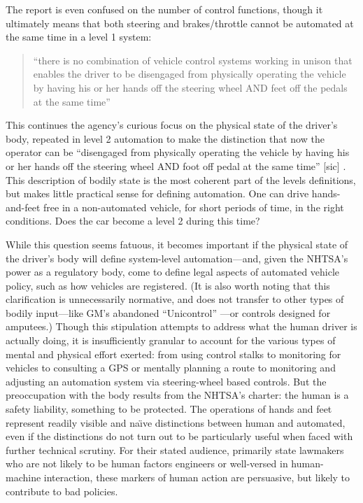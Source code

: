 The report is even confused on the number of control functions, though
it ultimately means that both steering and brakes/throttle cannot be
automated at the same time in a level 1 system: 

\begin{quote}
``there is no combination of vehicle control systems working in unison
that enables the driver to be disengaged from physically operating the
vehicle by having his or her hands off the steering wheel AND feet off
the pedals at the same time'' \cite[p. 4]{NHTSA}
\end{quote}

This continues the agency's curious focus on the physical state of the
driver's body, repeated in level 2 automation to make the distinction
that now the operator can be ``disengaged from physically operating the
vehicle by having his or her hands off the steering wheel AND foot off
pedal at the same time'' [sic] \cite[p. 5]{NHTSA}. This description of bodily state is
the most coherent part of the levels definitions, but makes little
practical sense for defining automation. One can drive hands-and-feet
free in a non-automated vehicle, for short periods of time, in the
right conditions. Does the car become a level 2 during this time?


While this question seems fatuous, it becomes important if the
physical state of the driver's body will define system-level
automation---and, given the NHTSA's power as a regulatory body, come
to define legal aspects of automated vehicle policy, such as how
vehicles are registered. (It is also worth
noting that this clarification is
unnecessarily normative, and does not transfer to other types of
bodily input---like GM's abandoned ``Unicontrol'' \cite[p. 8]{wetmore}---or controls designed
for amputees.) Though this stipulation attempts to address what the
human driver is actually doing, it is insufficiently granular to
account for the various types of mental and physical effort exerted:
from using control stalks to monitoring for vehicles to consulting a
GPS or mentally planning a route to monitoring and adjusting an
automation system via steering-wheel based controls. But the
preoccupation with the body results from the NHTSA's charter: the
human is a safety liability, something to be protected. The operations
of hands and feet represent readily visible and na\"{\i}ve distinctions
between human and automated, even if the distinctions do not turn out
to be particularly useful when faced with further technical scrutiny.
For their stated audience, primarily state lawmakers who are not
likely to be human factors engineers or well-versed in human-machine
interaction, these markers of human action are persuasive, but likely
to contribute to bad policies.


